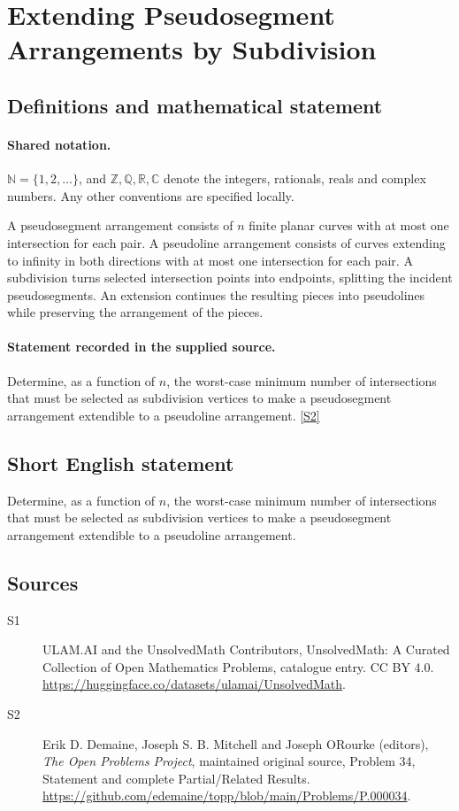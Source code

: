 \documentclass[11pt]{article}
\newcommand{\sref}[2]{\hyperlink{source:#1:#2}{[S#2]}}
\begin{document}
\section{Extending Pseudosegment Arrangements by Subdivision}\label{statement}

\subsection{Definitions and mathematical statement}

\paragraph{Shared notation.}$\mathbb N=\{1,2,\ldots\}$, and $\mathbb Z,\mathbb Q,\mathbb R,\mathbb C$ denote the integers, rationals, reals and complex numbers. Any other conventions are specified locally.


A pseudosegment arrangement consists of $n$ finite planar curves with at most one intersection for each pair. A pseudoline arrangement consists of curves extending to infinity in both directions with at most one intersection for each pair. A subdivision turns selected intersection points into endpoints, splitting the incident pseudosegments. An extension continues the resulting pieces into pseudolines while preserving the arrangement of the pieces.
\paragraph{Statement recorded in the supplied source.}
Determine, as a function of $n$, the worst-case minimum number of intersections that must be selected as subdivision vertices to make a pseudosegment arrangement extendible to a pseudoline arrangement. \sref{statement}{2}
\subsection{Short English statement}
Determine, as a function of $n$, the worst-case minimum number of intersections that must be selected as subdivision vertices to make a pseudosegment arrangement extendible to a pseudoline arrangement.
\subsection{Sources}
\begin{description}
\item[\hypertarget{source:statement:1}{S1}] ULAM.AI and the UnsolvedMath Contributors, UnsolvedMath: A Curated Collection of Open Mathematics Problems, catalogue entry. CC BY 4.0. \url{https://huggingface.co/datasets/ulamai/UnsolvedMath}.
\item[\hypertarget{source:statement:2}{S2}] Erik D. Demaine, Joseph S. B. Mitchell and Joseph O\textquotesingle Rourke (editors), \emph{The Open Problems Project}, maintained original source, Problem 34, Statement and complete Partial/Related Results. \url{https://github.com/edemaine/topp/blob/main/Problems/P.000034}.
\end{description}
\label{end:statement}
\end{document}
